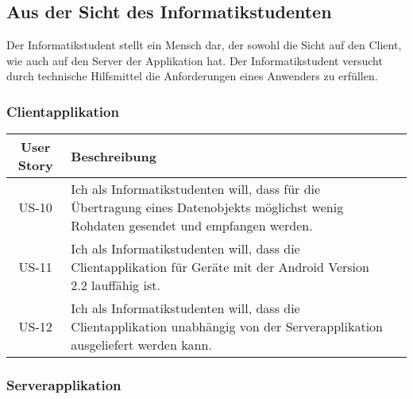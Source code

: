 \documentclass[listof=totocnumbered, bibliography=totocnumbered]{scrreprt}
\begin{document}
  \subsection{Aus der Sicht des Informatikstudenten}
  
  Der Informatikstudent stellt ein Mensch dar, der sowohl die Sicht auf den
  Client, wie auch auf den Server der Applikation hat. Der Informatikstudent
  versucht durch technische Hilfsmittel die Anforderungen eines Anwenders zu
  erfüllen.
  
  \subsubsection{Clientapplikation}
  
  \begin{tabular}{cp{13cm}l}
    \toprule
    User Story & Beschreibung \\
    \midrule
    US-10 & Ich als Informatikstudenten will, dass für die Übertragung eines
    Datenobjekts möglichst wenig Rohdaten gesendet und empfangen werden. \\
    US-11 & Ich als Informatikstudenten will, dass die Clientapplikation für
    Geräte mit der Android Version 2.2 lauffähig ist. \\
    US-12 & Ich als Informatikstudenten will, dass die Clientapplikation
    unabhängig von der Serverapplikation ausgeliefert werden kann. \\
    \bottomrule
  \end{tabular}
  
  \subsubsection{Serverapplikation}
  
\end{document}
